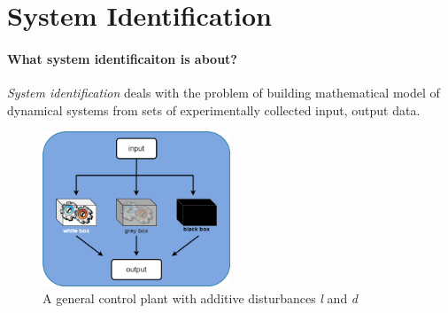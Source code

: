 \chapter{System Identification}    %
\subsubsection{What system identificaiton is about?}
\textit{System identification} deals with the problem of building mathematical model of dynamical systems from sets of experimentally collected input, output data.



\begin{figure}[htbp]
    \centering
    \includegraphics[width=0.5\textwidth]{images/system-id-scheme.png}
    \caption{A general control plant with additive disturbances \textit{l} and \textit{d}}
    \label{fig:id_classes}
\end{figure}

